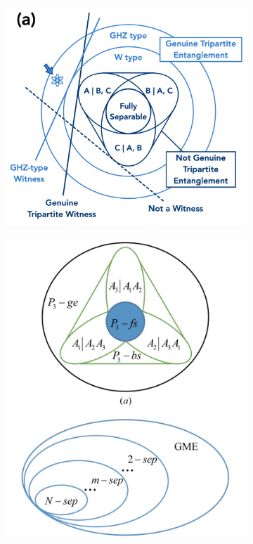 \documentclass[
aps,
pra,
linenumbers,
floatfix,
]{revtex4-2}
\theoremstyle{plain}
\theoremstyle{definition}
\begin{document}
\begin{figure}[!ht]
	\centering
	\begin{subfigure}{0.3\textwidth}
		\centering
		\includegraphics[width=.9\linewidth]{gme.jpg}
	\end{subfigure}
	\begin{subfigure}{0.3\textwidth}
		\centering
		\includegraphics[width=.8\linewidth]{sep.jpg}

\end{subfigure}
\end{figure}
\end{document}
